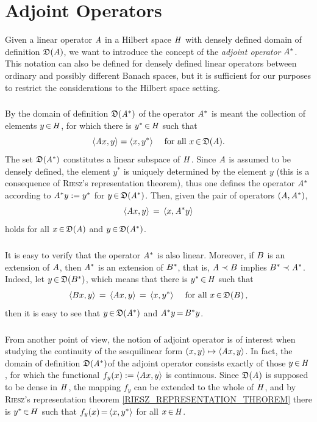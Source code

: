 \documentclass[11pt,twoside]{article}
\begin{document}
\section{Adjoint Operators}
Given a linear operator $\mathit{A}$ in a Hilbert space $\mathit{H}$
with densely defined domain of definition $\mathfrak{D}(\mathit{A})$,
we want to introduce the concept of the \textit{adjoint operator} $\mathit{A}^*$.
This notation can also be defined for densely defined linear operators
between ordinary and possibly different Banach spaces,
but it is sufficient for our purposes to restrict the considerations
to the Hilbert space setting.

\subparagraph*{}
By the domain of definition $\mathfrak{D}(\mathit{A}^*)$ of the operator $\mathit{A}^*$
is meant the collection of elements $y {\,\in\,} \mathit{H}$,
for which there is $y^* {\,\in\,} \mathit{H}$ such that
\[
\langle \mathit{A} x,y \rangle = \langle x,y^* \rangle
\quad \mbox{ for all } x {\,\in\,} \mathfrak{D}(\mathit{A}).
\]
The set $\mathfrak{D}(\mathit{A}^*)$ constitutes a linear subspace of $\mathit{H}$.
Since $\mathit{A}$ is assumed to be densely defined,
the element $y^*$ is uniquely determined by the element $y$
(this is a consequence of \textsc{Riesz}'s representation theorem),
thus one defines the operator $\mathit{A}^*$ according to
$\mathit{A}^* y :=  y^*$ for $y {\,\in\,} \mathfrak{D}(\mathit{A}^*)$.
Then,
given the pair of operators $(\mathit{A},\mathit{A}^*)$,
\[
\langle \mathit{A} x,y \rangle \,=\, \langle x,\mathit{A}^* y \rangle
\]
holds for all $x {\,\in\,} \mathfrak{D}(\mathit{A})$ and $y {\,\in\,} \mathfrak{D}(\mathit{A}^*)$.

\subparagraph*{}
It is easy to verify that the operator $\mathit{A}^*$ is also linear.
Moreover,
if ${B}$ is an extension of $\mathit{A}$,
then $\mathit{A}^*$ is an extension of ${B}^*$,
that is,
$\mathit{A} \prec {B}$ implies ${B}^* \prec \mathit{A}^*$.
Indeed,
let $y {\,\in\,} \mathfrak{D}({B}^*)$,
which means that there is $y^* {\,\in\,} \mathit{H}$ such that
\[
\langle {B} x,y \rangle \,=\, \langle \mathit{A} x,y \rangle \,=\, \langle x,y^* \rangle
\quad \mbox{ for all } x {\,\in\,} \mathfrak{D}({B})\,,
\]
then it is easy to see
that $y {\,\in\,} \mathfrak{D}(\mathit{A}^*)$ and $\mathit{A}^* y {\,=\,} {B}^* y$.

\subparagraph*{}
From another point of view,
the notion of adjoint operator is of interest when studying
the continuity of the sesquilinear form 
$(x,y) \mapsto \langle \mathit{A} x,y \rangle$.
In fact,
the domain of definition $\mathfrak{D}(\mathit{A}^* )$of the adjoint operator
consists exactly of those $y {\,\in\,} \mathit{H}$, 
for which the functional $f_y(x) := \langle \mathit{A} x,y \rangle$ is continuous.
Since $\mathfrak{D}(\mathit{A})$ is supposed to be dense in $\mathit{H}$,
the mapping $f_y$ can be extended to the whole of $\mathit{H}$,
and by \textsc{Riesz}'s representation theorem
\ref{RIESZ_REPRESENTATION_THEOREM} there is $y^* {\,\in\,} H$
such that $f_y(x) {\,=\,} \langle x,y^* \rangle$ for all $x {\,\in\,} \mathit{H}$.
\end{document}
